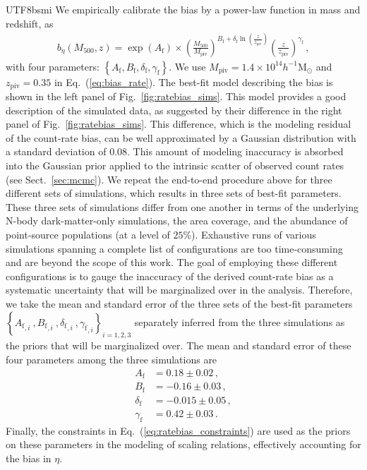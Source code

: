 \documentclass[longauth]{aa}
\newcommand{\Msunh}{\ensuremath{h^{-1}\mathrm{M}_{\odot}}}
\newcommand{\Mfiveoo}{\ensuremath{M_{500}}}
\newcommand{\redshift}{\ensuremath{z}}
\newcommand{\MPIV}{\ensuremath{M_{\mathrm{piv}}}}
\newcommand{\ZPIV}{\ensuremath{z_{\mathrm{piv}}}}
\newcommand{\rate}{\ensuremath{\eta}}
\newcommand{\brate}{\ensuremath{b_{\eta}}}
\newcommand{\AF}{\ensuremath{A_{\mathrm{f}}}}
\newcommand{\BF}{\ensuremath{B_{\mathrm{f}}}}
\newcommand{\deltaF}{\ensuremath{\delta_{\mathrm{f}}}}
\newcommand{\gammaF}{\ensuremath{\gamma_{\mathrm{f}}}}
\newcommand{\percent}{\ensuremath{\%}}
\begin{document}
\begin{CJK*}{UTF8}{bsmi}
We empirically calibrate the bias by a power-law function in mass and redshift, as
%
\begin{multline}
\label{eq:bias_rate}
\brate\left(\Mfiveoo,\redshift\right) = 
\exp\left(\AF\right) \times
\left(\frac{\Mfiveoo}{\MPIV}\right)^{\BF + \deltaF\ln\left(\frac{\redshift}{\ZPIV}\right)} \left(\frac{\redshift}{\ZPIV}\right)^{\gammaF} \, ,
\end{multline}
%
with four parameters: $\left\lbrace\AF, \BF, \deltaF, \gammaF\right\rbrace$.
We use $\MPIV = 1.4\times10^{14}\Msunh$ and $\ZPIV = 0.35$ in Eq.~(\ref{eq:bias_rate}).
The best-fit model describing the bias is shown in the left panel of Fig.~\ref{fig:ratebias_sims}.
This model provides a good description of the simulated data, as suggested by their difference in the right panel of Fig.~\ref{fig:ratebias_sims}.
This difference, which is the modeling residual of the count-rate bias, can be well approximated by a Gaussian distribution with a standard deviation of $0.08$. 
This amount of modeling inaccuracy is absorbed into the Gaussian prior applied to the intrinsic scatter of observed count rates (see Sect.~\ref{sec:mcmc}).
We repeat the end-to-end procedure above for three different sets of simulations, which results in three sets of best-fit parameters.
These three sets of simulations differ from one another in terms of the underlying N-body dark-matter-only simulations, the area coverage, and the abundance of point-source populations (at a level of $25\percent$).
Exhaustive runs of various simulations spanning a complete list of configurations are too time-consuming and are beyond the scope of this work.
The goal of employing these different configurations is to gauge the inaccuracy of the derived count-rate bias as a systematic uncertainty that will be marginalized over in the analysis.
Therefore, we take the mean and standard error of the three sets of the best-fit parameters $\left\lbrace {\AF}_{,i}~, {\BF}_{,i}~, {\deltaF}_{,i}~, {\gammaF}_{,i}\right\rbrace_{i = 1, 2, 3}$ separately inferred from the three simulations as the priors that will be marginalized over.
The mean and standard error of these four parameters among the three simulations are
%
\begin{align}
\label{eq:ratebias_constraints}
\AF               &= 0.18     \pm 0.02    \, , \nonumber \\
\BF                &= -0.16   \pm 0.03   \, , \nonumber \\
\deltaF          &= -0.015 \pm 0.05   \, , \nonumber \\
\gammaF      &= 0.42     \pm 0.03   \, .
\end{align}
%
Finally, the constraints in Eq.~(\ref{eq:ratebias_constraints}) are used as the priors on these parameters in the modeling of scaling relations, effectively accounting for the bias in \rate.




\end{CJK*}
\end{document}
